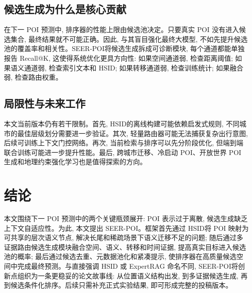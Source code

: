 \documentclass[10pt,twocolumn,fontset=none]{ctexart}
\newcommand{\method}{SEER-POI}
\newcommand{\hsid}{HSID}
\begin{document}
\subsection{候选生成为什么是核心贡献}
在下一 POI 预测中, 排序器的性能上限由候选池决定。只要真实 POI 没有进入候选集合, 最终结果就不可能正确。因此, 与其盲目强化最终大模型, 不如先提升候选池的覆盖率和相关性。\method 将候选生成拆成可诊断模块, 每个通道都能单独报告 Recall@K, 这使得系统优化更具方向性: 如果空间通道弱, 检查距离阈值; 如果语义通道弱, 检查索引文本和 \hsid; 如果转移通道弱, 检查训练统计; 如果融合弱, 检查路由权重。

\subsection{局限性与未来工作}
本文当前版本仍有若干限制。首先, \hsid 的离线构建可能依赖启发式规则, 不同城市的最佳层级划分需要进一步验证。其次, 轻量路由器可能无法捕获复杂出行意图, 后续可训练上下文门控网络。再次, 当前检索与排序可以先分阶段优化, 但端到端联合训练可能进一步提升性能。最后, 跨城市迁移、冷启动 POI、开放世界 POI 生成和地理约束强化学习也是值得探索的方向。

\section{结论}
本文围绕下一 POI 预测中的两个关键瓶颈展开: POI 表示过于离散, 候选生成缺乏上下文自适应性。为此, 本文提出 \method。框架首先通过 \hsid 将 POI 映射为可共享的层次语义节点, 解决长尾和稀疏场景下语义迁移不足的问题; 随后通过多证据路由候选生成模块融合空间、语义、转移和时间证据, 提高真实目标进入候选池的概率; 最后通过候选去重、元数据池化和紧凑提示, 使排序器在高质量候选空间中完成最终预测。与直接强调 HSID 或 ExpertRAG 命名不同, \method 将创新点组织为一条更稳妥的论文故事线: 从位置语义结构出发, 到多证据候选生成, 再到候选条件化排序。后续只需补充正式实验结果, 即可形成完整的投稿版本。
\end{document}
